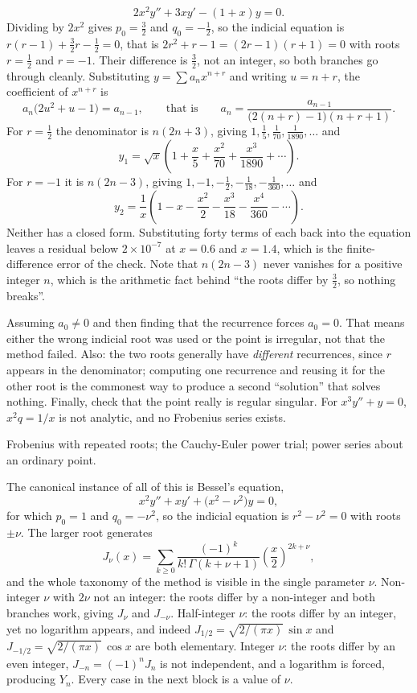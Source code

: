 \begin{worked}
\[2x^{2}y''+3xy'-(1+x)y=0.\]
Dividing by $2x^{2}$ gives $p_0=\tfrac32$ and $q_0=-\tfrac12$, so the indicial equation is $r(r-1)+\tfrac32r-\tfrac12=0$, that is $2r^{2}+r-1=(2r-1)(r+1)=0$ with roots $r=\tfrac12$ and $r=-1$. Their difference is $\tfrac32$, not an integer, so both branches go through cleanly. Substituting $y=\sum a_nx^{n+r}$ and writing $u=n+r$, the coefficient of $x^{n+r}$ is
\[a_n\bigl(2u^{2}+u-1\bigr)=a_{n-1},\qquad\text{that is}\qquad a_n=\frac{a_{n-1}}{\bigl(2(n+r)-1\bigr)(n+r+1)}.\]
For $r=\tfrac12$ the denominator is $n(2n+3)$, giving $1,\tfrac15,\tfrac1{70},\tfrac1{1890},\dots$ and
\[y_1=\sqrt{x}\left(1+\frac x5+\frac{x^{2}}{70}+\frac{x^{3}}{1890}+\cdots\right).\]
For $r=-1$ it is $n(2n-3)$, giving $1,-1,-\tfrac12,-\tfrac1{18},-\tfrac1{360},\dots$ and
\[y_2=\frac1x\left(1-x-\frac{x^{2}}{2}-\frac{x^{3}}{18}-\frac{x^{4}}{360}-\cdots\right).\]
Neither has a closed form. Substituting forty terms of each back into the equation leaves a residual below $2\times10^{-7}$ at $x=0.6$ and $x=1.4$, which is the finite-difference error of the check. Note that $n(2n-3)$ never vanishes for a positive integer $n$, which is the arithmetic fact behind ``the roots differ by $\tfrac32$, so nothing breaks''.
\end{worked}

\begin{trap}
Assuming $a_0\ne0$ and then finding that the recurrence forces $a_0=0$. That means either the wrong indicial root was used or the point is irregular, not that the method failed. Also: the two roots generally have \emph{different} recurrences, since $r$ appears in the denominator; computing one recurrence and reusing it for the other root is the commonest way to produce a second ``solution'' that solves nothing. Finally, check that the point really is regular singular. For $x^{3}y''+y=0$, $x^{2}q=1/x$ is not analytic, and no Frobenius series exists.
\end{trap}

\begin{seealsob}Frobenius with repeated roots; the Cauchy-Euler power trial; power series about an ordinary point.\end{seealsob}

The canonical instance of all of this is Bessel's equation,
\[x^{2}y''+xy'+\bigl(x^{2}-\nu^{2}\bigr)y=0,\]
for which $p_0=1$ and $q_0=-\nu^{2}$, so the indicial equation is $r^{2}-\nu^{2}=0$ with roots $\pm\nu$. The larger root generates
\[J_{\nu}(x)=\sum_{k\ge0}\frac{(-1)^{k}}{k!\,\Gamma(k+\nu+1)}\left(\frac x2\right)^{2k+\nu},\]
and the whole taxonomy of the method is visible in the single parameter $\nu$. Non-integer $\nu$ with $2\nu$ not an integer: the roots differ by a non-integer and both branches work, giving $J_{\nu}$ and $J_{-\nu}$. Half-integer $\nu$: the roots differ by an integer, yet no logarithm appears, and indeed $J_{1/2}=\sqrt{2/(\pi x)}\,\sin x$ and $J_{-1/2}=\sqrt{2/(\pi x)}\,\cos x$ are both elementary. Integer $\nu$: the roots differ by an even integer, $J_{-n}=(-1)^{n}J_n$ is not independent, and a logarithm is forced, producing $Y_n$. Every case in the next block is a value of $\nu$.

